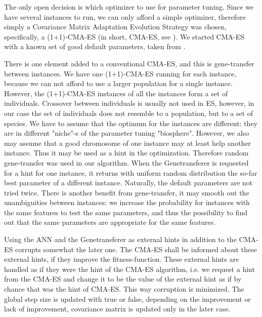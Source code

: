 \documentclass{MYsig-alternate}
\begin{document}
The only open decision is which optimizer to use for parameter tuning. Since we have several instances to run, we can only afford a simple optimizer, therefore simply a Covariance Matrix Adaptation Evolution Strategy was chosen, specifically, a (1+1)-CMA-ES (in short, CMA-ES, see \cite{hansen2001ecj}). We started CMA-ES with a known set of good default parameters, taken from \cite{BibGECCO:2010}.

There is one element added to a conventional CMA-ES, and this is gene-transfer between instances. We have one (1+1)-CMA-ES running for each instance, because we can not afford to use a larger population for a single instance. However, the (1+1)-CMA-ES instances of all the instances form a set of individuals. Crossover between individuals is usually not used in ES, however, in our case the set of individuals does not resemble to a population, but to a set of species. We have to assume that the optimum for the instances are different: they are in different "niche"-s of the parameter tuning "biosphere". However, we also may assume that a good chromosome of one instance may at least help another instance. Thus it may be used as a hint in the optimization. Therefore random gene-transfer was used in our algorithm. When the Genetransferer is requested for a hint for one instance, it returns with uniform random distribution the so-far best parameter of a different instance. Naturally, the default parameters are not tried twice. There is another benefit from gene-transfer, it may smooth out the unambiguities between instances: we increase the probability for instances with the same features to test the same parameters, and thus the possibility to find out that the same parameters are appropriate for the same features.

Using the ANN and the Genetransferer as external hints in addition to the CMA-ES corrupts somewhat the later one. The CMA-ES shall be informed about these external hints, if they improve the fitness-function. These external hints are handled as if they were the hint of the CMA-ES algorithm, i.e. we request a hint from the CMA-ES and change it to be the value of the external hint as if by chance that was the hint of CMA-ES. This way corruption is minimized. The global step size is updated with true or false, depending on the improvement or lack of improvement, covariance matrix is updated only in the later case.
\end{document}
